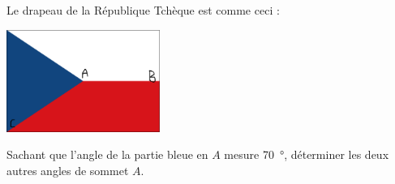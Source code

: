 
\begin{exercice}\label{exo2smath-0167}

    Le drapeau de la République Tchèque est comme ceci :
    \begin{center}
\includegraphics[width=5cm]{Czech_Republic.pdf}
    \end{center}
    Sachant que l'angle de la partie bleue en \( A\) mesure \SI{70}{\degree}, déterminer les deux autres angles de sommet \( A\).

    
\end{exercice}
